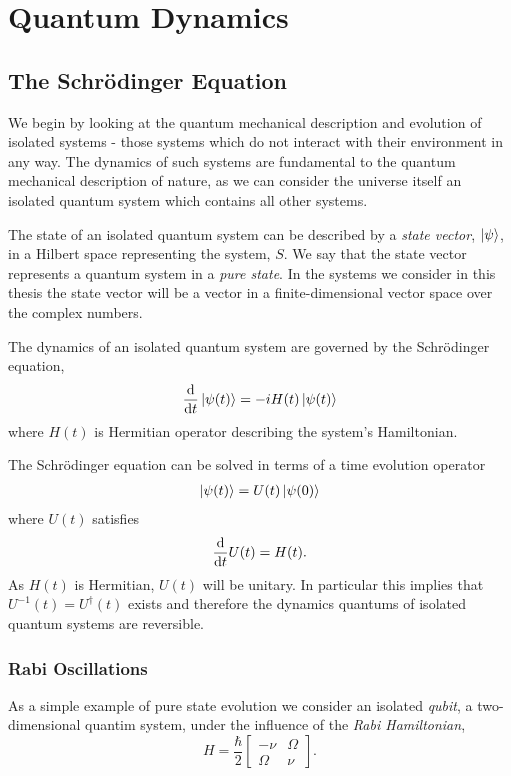 \chapter{Quantum Dynamics} 
\label{ch:QuantumDynamics}

\section{The Schr\"odinger Equation}

We begin by looking at the quantum mechanical description and evolution of isolated systems - those systems which do not interact with their environment in any way. The dynamics of such systems are fundamental to the quantum mechanical description of nature, as we can consider the universe itself an isolated quantum system which contains all other systems. 

The state of an isolated quantum system can be described by a \textit{state vector}, $\left\vert\psi\right\rangle$, in a Hilbert space representing the system, $S$. We say that the state vector represents a quantum system in a \textit{pure state}. In the systems we consider in this thesis the state vector will be a vector in a finite-dimensional vector space over the complex numbers. 

The dynamics of an isolated quantum system are governed by the Schr\"odinger equation,
\begin{align}
  \label{qd:schrodinger_eq}
  \frac{\mathrm{d}}{\mathrm{d}t} \left\vert\psi(t)\right\rangle = -i H(t) \left\vert\psi(t)\right\rangle
\end{align}
where $H(t)$ is Hermitian operator describing the system's Hamiltonian.

The Schr\"odinger equation can be solved in terms of a time evolution operator
\begin{align}
  \left\vert\psi(t)\right\rangle = U(t)\left\vert\psi(0)\right\rangle
\end{align}
where $U(t)$ satisfies
\begin{align}
  \frac{\mathrm{d}}{\mathrm{d}t} U(t) = H(t).
\end{align}
As $H(t)$ is Hermitian, $U(t)$ will be unitary. In particular this implies that $U^{-1}(t) = U^\dagger(t)$ exists and therefore the dynamics quantums of isolated quantum systems are reversible.

\subsection{Rabi Oscillations}

As a simple example of pure state evolution we consider an isolated \textit{qubit}, a two-dimensional quantim system, under the influence of the \textit{Rabi Hamiltonian},
\begin{equation} \label{rabi_hamiltonian}
  H = \frac{\hbar}{2}
\begin{bmatrix}
  -\nu & \Omega \\
  \Omega & \nu 
\end{bmatrix}.
\end{equation}

